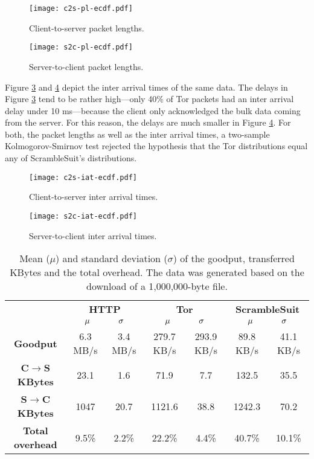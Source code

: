 \documentclass{sig-alternate}
\newcommand{\pt}{\textsf{ScrambleSuit}}
\numberwithin{enumi}{section}
\numberwithin{notesctr}{section}
\begin{document}
\begin{figure}[t]
\centering
\texttt{[image: c2s-pl-ecdf.pdf]}
\caption{Client-to-server packet lengths.}
\label{fig:c2spl}
\end{figure}

\begin{figure}[t]
\centering
\texttt{[image: s2c-pl-ecdf.pdf]}
\caption{Server-to-client packet lengths.}
\label{fig:s2cpl}
\end{figure}

Figure \ref{fig:c2siat} and \ref{fig:s2ciat} depict the inter arrival times of the same data. The
delays in Figure \ref{fig:c2siat} tend to be rather high---only 40\% of Tor packets had an inter
arrival delay under 10 ms---because the client only acknowledged the bulk data coming from the
server. For this reason, the delays are much smaller in Figure \ref{fig:s2ciat}. For both, the
packet lengths as well as the inter arrival times, a two-sample Kolmogorov-Smirnov test rejected the
hypothesis that the Tor distributions equal any of \pt{}'s distributions.

\begin{figure}[t]
\centering
\texttt{[image: c2s-iat-ecdf.pdf]}
\caption{Client-to-server inter arrival times.}
\label{fig:c2siat}
\end{figure}

\begin{figure}[t]
\centering
\texttt{[image: s2c-iat-ecdf.pdf]}
\caption{Server-to-client inter arrival times.}
\label{fig:s2ciat}
\end{figure}

\begin{table*}[t]
\caption{Mean ($\mu$) and standard deviation ($\sigma$) of the goodput, transferred KBytes and the
total overhead. The data was generated based on the download of a 1,000,000-byte file.}
\label{table:performance}
\begin{center}
\begin{tabular}{|c|c|c|c|c|c|c|}
\hline
& \multicolumn{2}{|c|}{\textbf{HTTP}} & \multicolumn{2}{|c|}{\textbf{Tor}} &
	\multicolumn{2}{|c|}{\textbf{\pt{}}} \\
& \multicolumn{2}{|c|}{$\mu\hspace{1.2cm}\sigma$} &
   \multicolumn{2}{|c|}{$\mu\hspace{1.2cm}\sigma$} &
   \multicolumn{2}{|c|}{$\mu\hspace{1.2cm}\sigma$} \\

\hline
\textbf{Goodput} & 6.3 MB/s & 3.4 MB/s & 279.7 KB/s & 293.9 KB/s & 89.8 KB/s & 41.1 KB/s \\
\hline
\textbf{C$\to$S KBytes} & 23.1 & 1.6 & 71.9 & 7.7 & 132.5 & 35.5 \\
\hline
\textbf{S$\to$C KBytes} & 1047 & 20.7 & 1121.6 & 38.8 & 1242.3 & 70.2 \\
\hline
\textbf{Total overhead} & 9.5\% & 2.2\% & 22.2\% & 4.4\% & 40.7\% & 10.1\% \\
\hline
\end{tabular}
\end{center}
\end{table*}
\end{document}
